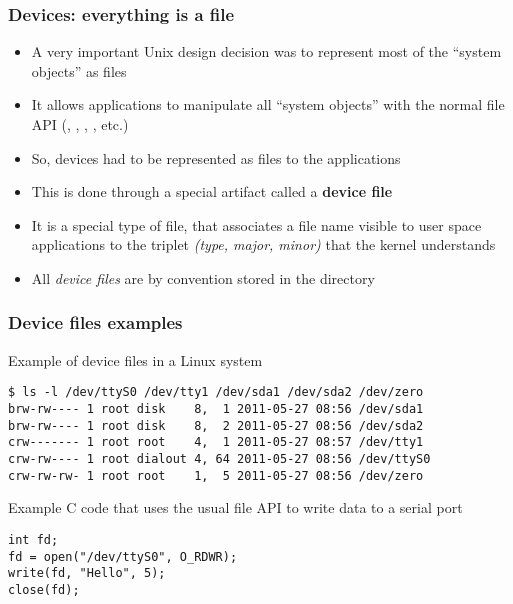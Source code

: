 \begin{frame}
  \frametitle{Devices: everything is a file}
  \begin{itemize}
  \item A very important Unix design decision was to represent most of
    the ``system objects'' as files
  \item It allows applications to manipulate all “system objects” with
    the normal file API (, , ,
    , etc.)
  \item So, devices had to be represented as files to the applications
  \item This is done through a special artifact called a {\bf device
      file}
  \item It is a special type of file, that associates a file name
    visible to user space applications to the triplet {\em (type,
      major, minor)} that the kernel understands
  \item All {\em device files} are by convention stored in the
     directory
  \end{itemize}
\end{frame}

\begin{frame}[fragile]
\frametitle{Device files examples}

Example of device files in a Linux system

\small
\begin{verbatim}
$ ls -l /dev/ttyS0 /dev/tty1 /dev/sda1 /dev/sda2 /dev/zero
brw-rw---- 1 root disk    8,  1 2011-05-27 08:56 /dev/sda1
brw-rw---- 1 root disk    8,  2 2011-05-27 08:56 /dev/sda2
crw------- 1 root root    4,  1 2011-05-27 08:57 /dev/tty1
crw-rw---- 1 root dialout 4, 64 2011-05-27 08:56 /dev/ttyS0
crw-rw-rw- 1 root root    1,  5 2011-05-27 08:56 /dev/zero
\end{verbatim}
\normalsize

Example C code that uses the usual file API to write data to a serial port

\small
\begin{verbatim}
int fd;
fd = open("/dev/ttyS0", O_RDWR);
write(fd, "Hello", 5);
close(fd);
\end{verbatim}
\end{frame}

